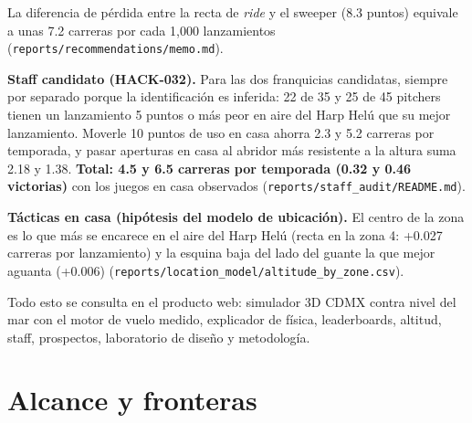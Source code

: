 \documentclass[
  english,
  spanish,
  10pt,
  letterpaper,
]{article}
\let\diablosTT\texttt
\renewcommand{\texttt}[1]{{\color{gris}\fontsize{8.2}{10}\selectfont\diablosTT{#1}}}
\begin{document}
La diferencia de pérdida entre la recta de \emph{ride} y el sweeper (8.3
puntos) equivale a unas 7.2 carreras por cada 1,000 lanzamientos
(\texttt{reports/recommendations/memo.md}).

\textbf{Staff candidato (HACK-032).} Para las dos franquicias
candidatas, siempre por separado porque la identificación es inferida:
22 de 35 y 25 de 45 pitchers tienen un lanzamiento 5 puntos o más peor
en aire del Harp Helú que su mejor lanzamiento. Moverle 10 puntos de uso
en casa ahorra 2.3 y 5.2 carreras por temporada, y pasar aperturas en
casa al abridor más resistente a la altura suma 2.18 y 1.38.
\textbf{Total: 4.5 y 6.5 carreras por temporada (0.32 y 0.46 victorias)}
con los juegos en casa observados
(\texttt{reports/staff\_audit/README.md}).

\textbf{Tácticas en casa (hipótesis del modelo de ubicación).} El centro
de la zona es lo que más se encarece en el aire del Harp Helú (recta en
la zona 4: +0.027 carreras por lanzamiento) y la esquina baja del lado
del guante la que mejor aguanta (+0.006)
(\texttt{reports/location\_model/altitude\_by\_zone.csv}).

Todo esto se consulta en el producto web: simulador 3D CDMX contra nivel
del mar con el motor de vuelo medido, explicador de física,
leaderboards, altitud, staff, prospectos, laboratorio de diseño y
metodología.

\section{Alcance y fronteras}\label{alcance-y-fronteras}
\end{document}
